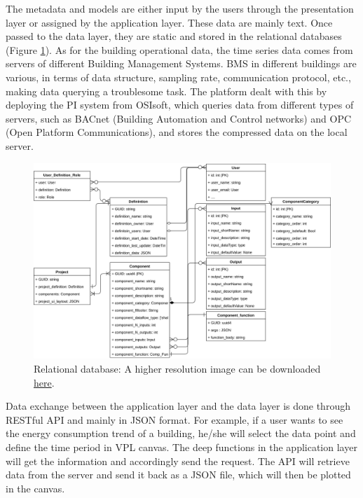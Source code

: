 \documentclass{scsSimAUDPaperFormat}
\begin{document}
The metadata and models are either input by the users through the presentation layer or assigned by the application layer. These data are mainly text. Once passed to the data layer, they are static and stored in the relational databases (Figure \ref{fig:relationDatabase}). As for the building operational data, the time series data comes from servers of different Building Management Systems. BMS in different buildings are various, in terms of data structure, sampling rate, communication protocol, etc., making data querying a troublesome task. The platform dealt with this by deploying the PI system from OSIsoft, which queries data from different types of servers, such as BACnet (Building Automation and Control networks) and OPC (Open Platform Communications), and stores the compressed data on the local server.\par
\begin{figure}
\includegraphics[width=\columnwidth]{imgs/uml_relationship.jpeg}
\caption{Relational database: A higher resolution image can be downloaded  \href{https://user-images.githubusercontent.com/6969514/72235771-e9e89f80-360e-11ea-9cf7-91c0f521576c.jpeg}{here}. 
}
\label{fig:relationDatabase}
\end{figure}
Data exchange between the application layer and the data layer is done through RESTful API and mainly in JSON format. For example, if a user wants to see the energy consumption trend of a building, he/she will select the data point and define the time period in VPL canvas. The deep functions in the application layer will get the information and accordingly send the request. The API will retrieve data from the server and send it back as a JSON file, which will then be plotted in the canvas.
\end{document}
